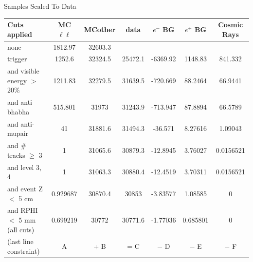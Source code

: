 \documentclass[landscape]{article}
\begin{document}
\begin{center}
{\sc Samples Scaled To Data} \\
\vspace{0.2 cm}
\begin{tabular}{l c c c c c c}
\hline\hline Cuts applied & MC$\ell\ell$ & MCother & data & $e^-$ BG & $e^+$ BG & Cosmic Rays \\\hline

 none & 1812.97 & 32603.3 \\
 trigger & 1252.6 & 32324.5 & 25472.1 & -6369.92 & 1148.83 & 841.332 \\
 {\sc and} visible energy $>$ 20\% & 1211.83 & 32279.5 & 31639.5 & -720.669 & 88.2464 & 66.9441 \\
 {\sc and} anti-bhabha & 515.801 & 31973 & 31243.9 & -713.947 & 87.8894 & 66.5789 \\
 {\sc and} anti-mupair & 41 & 31881.6 & 31494.3 & -36.571 & 8.27616 & 1.09043 \\
 {\sc and} \# tracks $\ge$ 3 & 1 & 31065.6 & 30879.3 & -12.8945 & 3.76027 & 0.0156521 \\
 {\sc and} level 3, 4 & 1 & 31063.3 & 30880.4 & -12.4519 & 3.70311 & 0.0156521 \\
 {\sc and} event Z $<$ 5 cm & 0.929687 & 30870.4 & 30853 & -3.83577 & 1.08585 & 0 \\
 {\sc and} RPHI $<$ 5 mm (all cuts) & 0.699219 & 30772 & 30771.6 & -1.77036 & 0.685801 & 0 \\\hline\hline

(last line constraint) & A & + B & = C & $-$ D & $-$ E & $-$ F \\

\end{tabular}
\end{center}

\vfill
\end{document}
